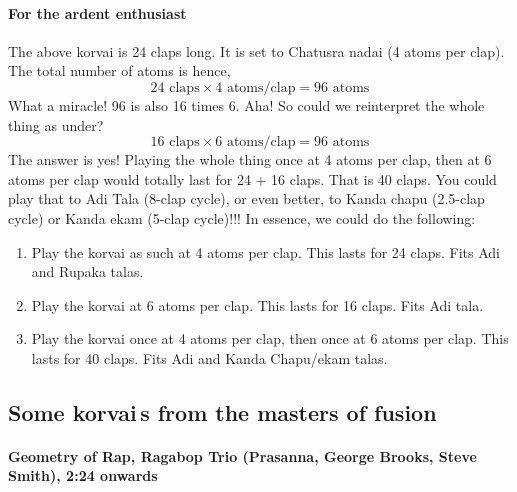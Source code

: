 \paragraph{For the ardent enthusiast}
The above korvai is 24 claps long. It is set to Chatusra nadai (4 atoms per clap). The
total number of atoms is hence,
\[ 24 \text{ claps} \times 4 \text{ atoms/clap} = 96 \text{ atoms} \]
What a miracle! 96 is also 16 times 6. Aha! So could we reinterpret the whole thing as
under?
\[ 16 \text{ claps} \times 6 \text{ atoms/clap} = 96 \text{ atoms} \]
The answer is yes! Playing the whole thing once at 4 atoms per clap, then at 6 atoms
per clap would totally last for 24 + 16 claps. That is 40 claps. You could play that
to Adi Tala (8-clap cycle), or even better, to Kanda chapu (2.5-clap cycle) or Kanda
ekam (5-clap cycle)!!! In essence, we could do the following:
\begin{enumerate}
  \item Play the korvai as such at 4 atoms per clap. This lasts for 24 claps. Fits Adi
    and Rupaka talas.
  \item Play the korvai at 6 atoms per clap. This lasts for 16 claps. Fits Adi tala.
  \item Play the korvai once at 4 atoms per clap, then once at 6 atoms per clap. This
    lasts for 40 claps. Fits Adi and Kanda Chapu/ekam talas.
\end{enumerate}

\subsection{Some korvai\,s from the masters of fusion}

\paragraph{Geometry of Rap, Ragabop Trio (Prasanna, George Brooks, Steve Smith), 2:24 onwards}

